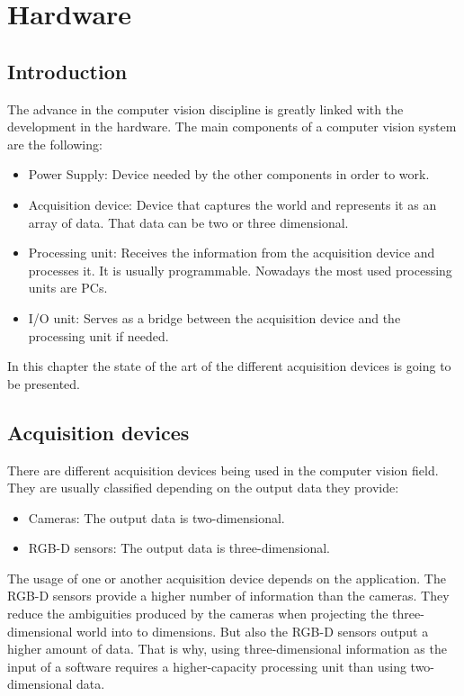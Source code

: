 \chapter*{Hardware}

 
 
\section*{Introduction}
The advance in the computer vision discipline is greatly linked with the development in the hardware. The main components of a computer vision system are the following: 

\begin{itemize}
	\item{Power Supply: } Device needed by the other components in order to work. 
	\item{Acquisition device: } Device that captures the world and represents it as an array of data. That data can be two or three dimensional. 
	\item{Processing unit:} Receives the information from the acquisition device and processes it. It is usually programmable. Nowadays the most used processing units are PCs. 
	\item{I/O unit: } Serves as a bridge between the acquisition device and the processing unit if needed. 

\end{itemize}

In this chapter the state of the art of the different acquisition devices is going to be presented. 

\section*{Acquisition devices}
There are different acquisition devices being used in the computer vision field. They are usually classified depending on the output data they provide: 

\begin{itemize}
	\item{Cameras:}	The output data is two-dimensional. 
	\item{RGB-D sensors:} The output data is three-dimensional. 
\end{itemize}

The usage of one or another acquisition device depends on the application. The RGB-D sensors provide a higher number of information than the cameras. They reduce the ambiguities produced by the cameras when projecting the three-dimensional world into to dimensions. But also the RGB-D sensors output a higher amount of data. 
That is why, using three-dimensional information as the input of a software requires a higher-capacity processing unit than using two-dimensional data.



